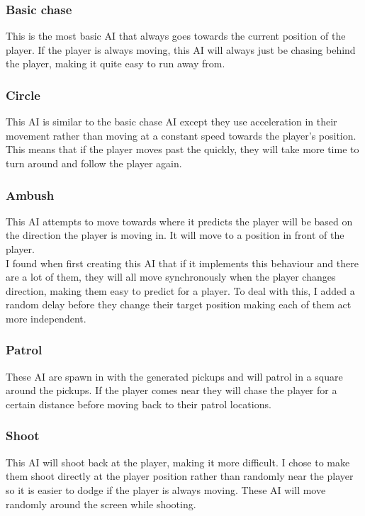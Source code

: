 \documentclass{article}
\newcommand{\n}[0]{\\[\baselineskip]}
\begin{document}
\subsubsection{Basic chase}
This is the most basic AI that always goes towards the current position of the player. If the player is always moving, this AI will always just be chasing behind the player, making it quite easy to run away from.

\subsubsection{Circle}
This AI is similar to the basic chase AI except they use acceleration in their movement rather than moving at a constant speed towards the player's position. This means that if the player moves past the quickly, they will take more time to turn around and follow the player again. 

\subsubsection{Ambush}
This AI attempts to move towards where it predicts the player will be based on the direction the player is moving in. It will move to a position in front of the player. 
\n
I found when first creating this AI that if it implements this behaviour and there are a lot of them, they will all move synchronously when the player changes direction, making them easy to predict for a player. To deal with this, I added a random delay before they change their target position making each of them act more independent.

\subsubsection{Patrol}
These AI are spawn in with the generated pickups and will patrol in a square around the pickups. If the player comes near they will chase the player for a certain distance before moving back to their patrol locations. 

\subsubsection{Shoot}
This AI will shoot back at the player, making it more difficult. I chose to make them shoot directly at the player position rather than randomly near the player so it is easier to dodge if the player is always moving. These AI will move randomly around the screen while shooting.
\end{document}
